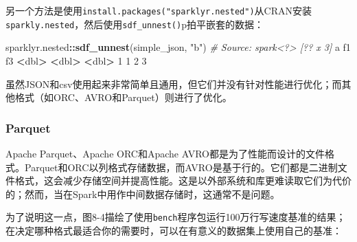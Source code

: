 \documentclass[
]{article}
\newenvironment{Shaded}{\begin{snugshade}}{\end{snugshade}}
\newcommand{\CommentTok}[1]{\textcolor[rgb]{0.56,0.35,0.01}{\textit{#1}}}
\newcommand{\DataTypeTok}[1]{\textcolor[rgb]{0.13,0.29,0.53}{#1}}
\newcommand{\DecValTok}[1]{\textcolor[rgb]{0.00,0.00,0.81}{#1}}
\newcommand{\ErrorTok}[1]{\textcolor[rgb]{0.64,0.00,0.00}{\textbf{#1}}}
\newcommand{\KeywordTok}[1]{\textcolor[rgb]{0.13,0.29,0.53}{\textbf{#1}}}
\newcommand{\NormalTok}[1]{#1}
\newcommand{\OperatorTok}[1]{\textcolor[rgb]{0.81,0.36,0.00}{\textbf{#1}}}
\newcommand{\StringTok}[1]{\textcolor[rgb]{0.31,0.60,0.02}{#1}}
\begin{document}
\begin{Shaded}
\end{Shaded}

另一个方法是使用\texttt{install.packages("sparklyr.nested")}从CRAN安装\texttt{sparkly.nested}，然后使用\texttt{sdf\_unnest()}p拍平嵌套的数据：

\begin{Shaded}
\begin{Highlighting}[]
\NormalTok{sparklyr.nested}\OperatorTok{::}\KeywordTok{sdf_unnest}\NormalTok{(simple_json, }\StringTok{"b"}\NormalTok{)}
\CommentTok{# Source: spark<?> [?? x 3]}
\NormalTok{ a f1 f3}
 \OperatorTok{<}\NormalTok{dbl}\OperatorTok{>}\StringTok{ }\ErrorTok{<}\NormalTok{dbl}\OperatorTok{>}\StringTok{ }\ErrorTok{<}\NormalTok{dbl}\OperatorTok{>}
\DecValTok{1} \DecValTok{1} \DecValTok{2} \DecValTok{3}
\end{Highlighting}
\end{Shaded}

虽然JSON和csv使用起来非常简单且通用，但它们并没有针对性能进行优化；而其他格式（如ORC、AVRO和Parquet）则进行了优化。

\hypertarget{parquet}{%
\subsubsection{Parquet}\label{parquet}}

Apache Parquet、Apache ORC和Apache
AVRO都是为了性能而设计的文件格式。Parquet和ORC以列格式存储数据，而AVRO是基于行的。它们都是二进制文件格式，这会减少存储空间并提高性能。这是以外部系统和库更难读取它们为代价的；然而，当在Spark中用作中间数据存储时，这通常不是问题。

为了说明这一点，图8-4描绘了使用\texttt{bench}程序包运行100万行写速度基准的结果；在决定哪种格式最适合你的需要时，可以在有意义的数据集上使用自己的基准：
\end{document}
